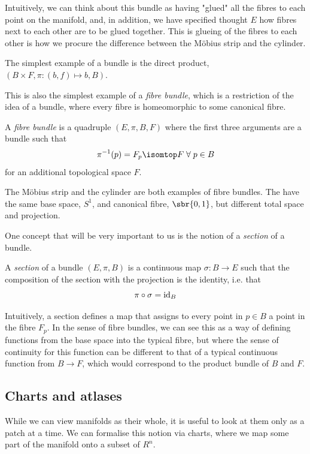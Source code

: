 Intuitively, we can think about this bundle as having "glued" all the fibres to each point on the manifold, and, in addition, we have specified thought \(E\) how fibres next to each other are to be glued together. This is glueing of the fibres to each other is how we procure the difference between the M\"{o}bius strip and the cylinder.

The simplest example of a bundle is the direct product, \((B\times F, \pi: (b, f) \mapsto b, B)\).

This is also the simplest example of a \emph{fibre bundle}, which is a restriction of the idea of a bundle, where every fibre is homeomorphic to some canonical fibre.
\begin{definition}
    \label{def:fibre_bundle}
    A \emph{fibre bundle} is a quadruple \((E, \pi, B, F)\) where the first three arguments are a bundle such that \[\pi^{-1}(p) = F_p \isomtop F \; \forall \; p\in B\] for an additional topological space \(F\). 
\end{definition}
The M\"{o}bius strip and the cylinder are both examples of fibre bundles.
The have the same base space, \(S^1\), and canonical fibre, \(\sbr{0,1}\), but different total space and projection.

One concept that will be very important to us is the notion of a \emph{section} of a bundle.
\begin{definition}[Section]
    A \emph{section} of a bundle \((E, \pi, B)\) is a continuous map \(\sigma: B \to E\) such that the composition of the section with the projection is the identity, i.e. that \[\pi \circ \sigma = \operatorname{id}_B\]
\end{definition}
Intuitively, a section defines a map that assigns to every point in \(p\in B\) a point in the fibre \(F_p\).
In the sense of fibre bundles, we can see this as a way of defining functions from the base space into the typical fibre, but where the sense of continuity for this function can be different to that of a typical continuous function from \(B \to F\), which would correspond to the product bundle of \(B\) and \(F\).

\subsection{Charts and atlases}
While we can view manifolds as their whole, it is useful to look at them only as a patch at a time.
We can formalise this notion via charts, where we map some part of the manifold onto a subset of \(R^n\).

